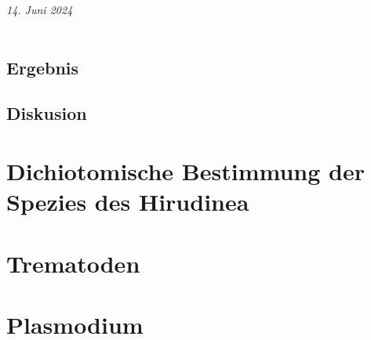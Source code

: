 \documentclass[oneside,10pt,a4paper]{report}
\begin{document}
	
	\textit{14. Juni 2024}\\
	\\
	\section{Ergebnis}
	\section{Diskusion}
	
	\chapter{Dichiotomische Bestimmung der Spezies des Hirudinea}
	
	\chapter{Trematoden}
	
	
	\chapter{Plasmodium}
	
	
	
\end{document}
